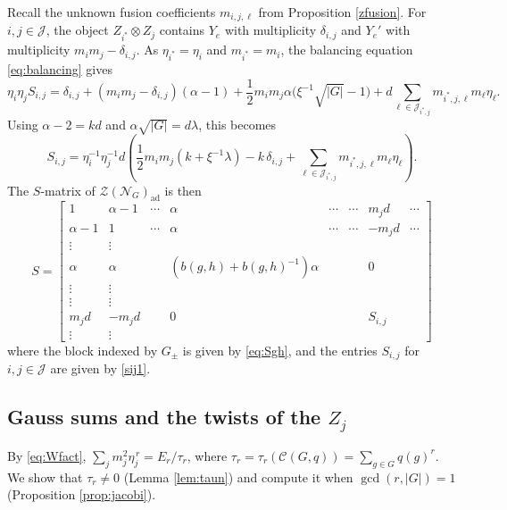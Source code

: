 \documentclass[10pt]{article}
\theoremstyle{plain}
\theoremstyle{definition}
\theoremstyle{plain}
\begin{document}
Recall the unknown fusion coefficients $m_{i,j,\ell}$ from Proposition \ref{zfusion}. For $i,j\in\mathcal{J}$, the object $Z_{i^\ast}\otimes Z_j$ contains $Y_e$ with multiplicity $\delta_{i,j}$ and $Y_e'$ with multiplicity $m_im_j-\delta_{i,j}$. As $\eta_{i^\ast}=\eta_i$ and $m_{i^\ast}=m_i$, the balancing equation \eqref{eq:balancing} gives
\[
\eta_i\eta_jS_{i,j}=\delta_{i,j}+(m_im_j-\delta_{i,j})(\alpha-1)+\frac12m_im_j\alpha\bigl(\xi^{-1}\sqrt{|G|}-1\bigr)+d\sum_{\ell\in\mathcal{J}_{i^\ast,j}}m_{i^\ast,j,\ell}m_\ell\eta_\ell .
\]
Using $\alpha-2=kd$ and $\alpha\sqrt{|G|}=d\lambda$, this becomes
\begin{equation}\label{sij1}
S_{i,j}=\eta_i^{-1}\eta_j^{-1}d\left(\frac{1}{2}m_im_j\left(k+\xi^{-1}\lambda\right)-k\,\delta_{i,j}+\sum_{\ell\in\mathcal{J}_{i^\ast,j}}m_{i^\ast,j,\ell}m_\ell\eta_\ell\right).
\end{equation}
The $S$-matrix of $\mathcal{Z}(\mathcal{N}_G)_\mathrm{ad}$ is then
\begin{equation}
S = \left[\begin{array}{cc|ccc|ccc}
1 & \alpha-1 & \cdots & \alpha & \cdots & \cdots & m_jd & \cdots \\ 
\alpha-1 & 1 & \cdots & \alpha & \cdots & \cdots & -m_jd & \cdots \\\hline
\vdots & \vdots & & & & & \\
\alpha & \alpha & & (b(g,h)+b(g,h)^{-1})\alpha &  &  & 0 &  \\
\vdots & \vdots & & & & \\\hline
\vdots & \vdots &  &  &  & &    \\
m_jd & -m_jd &  &  0& &  &  S_{i,j}     \\
\vdots & \vdots &  & &  &
\end{array}\right]
\end{equation}
where the block indexed by $G_{\pm}$ is given by \eqref{eq:Sgh}, and the entries $S_{i,j}$ for $i,j\in\mathcal{J}$ are given by \eqref{sij1}.


\subsection{Gauss sums and the twists of the \texorpdfstring{$Z_j$}{Zj}}\label{subsec:twistmoments}

By \eqref{eq:Wfact}, $\sum_jm_j^2\eta_j^{\,r}=E_r/\tau_r$, where $\tau_r=\tau_r(\mathcal{C}(G,q))=\sum_{g\in G}q(g)^r$. We show that $\tau_r\neq0$ (Lemma \ref{lem:taun}) and compute it when $\gcd(r,|G|)=1$ (Proposition \ref{prop:jacobi}).
\end{document}
